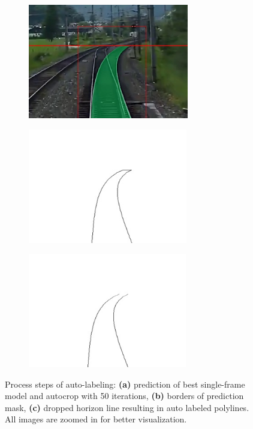 \begin{figure}[H]
    \centering
    \begin{subfigure}{0.3\textwidth}
        \centering
        \includegraphics[width=\linewidth,height=5cm,keepaspectratio]{PICs/usedDatasets/predictedImage.jpg}
        \caption{}
        \label{fig:autolabler_a}
    \end{subfigure}
    \hspace*{0.02\textwidth} %
    \begin{subfigure}{0.3\textwidth}
        \centering
        \includegraphics[width=\linewidth,height=5cm,keepaspectratio]{PICs/usedDatasets/maskBorders.jpg}
        \caption{}
        \label{fig:autolabler_b}
    \end{subfigure}
    \hspace*{0.02\textwidth} %
    \begin{subfigure}{0.3\textwidth}
        \centering
        \includegraphics[width=\linewidth,height=5cm,keepaspectratio]{PICs/usedDatasets/justLines.jpg}
        \caption{}
        \label{fig:autolabler_c}
    \end{subfigure}
    \caption{Process steps of auto-labeling: \textbf{(a)} prediction of best single-frame model and autocrop with 50 iterations, \textbf{(b)} borders of prediction mask, \textbf{(c)} dropped horizon line resulting in auto labeled polylines. All images are zoomed in for better visualization.}
    \label{fig:autolabler}
\end{figure}